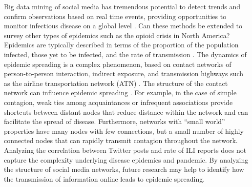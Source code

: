 \documentclass[sigconf]{acmart}
\begin{document}
Big data mining of social media has tremendous potential to detect trends and confirm 
observations based on real time events, providing opportunities to monitor infectious 
disease on a global level \cite{hay13}. Can these methods be extended to survey other 
types of epidemics such as the opioid crisis in North America?\cite{smith16} Epidemics 
are typically described in terms of the proportion of the population infected, those yet 
to be infected, and the rate of transmission \cite{hethcote00}. The dynamics of epidemic 
spreading is a complex phenomenon, based on contact networks of person-to-person interaction,
indirect exposure, and transmission highways such as the airline transportation network 
(ATN) \cite{Colizza06}. The structure of the contact network can influence epidemic spreading
\cite{pastor01}. For example, in the case of simple contagion, weak ties among acquaintances
or infrequent associations provide shortcuts between distant nodes that reduce distance 
within the network \cite{granovetter73} and can facilitate the spread of disease. 
Furthermore, networks with ``small world'' properties have many nodes with few connections, 
but a small number of highly connected nodes that can rapidly transmit contagion throughout 
the network. Analyzing the correlation between Twitter posts and rate of ILI reports does 
not capture the complexity underlying disease epidemics and pandemic. By analyzing the 
structure of social media networks, future research may help to identify how the 
transmission of information online leads to epidemic spreading\cite{zhu17}.



 
\end{document}
